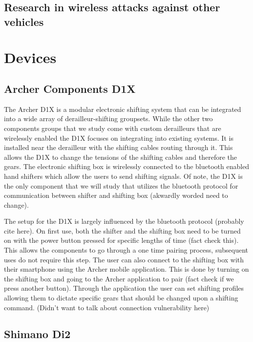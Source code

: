 \documentclass[letterpaper,twocolumn,10pt]{article}
\begin{document}
\subsection{Research in wireless attacks against other vehicles}



\section{Devices}
\subsection{Archer Components D1X}

The Archer D1X is a modular electronic shifting system that can be integrated into a wide array of derailleur-shifting groupsets. While the other two components groups that we study come with custom derailleurs that are wirelessly enabled the D1X focuses on integrating into existing systems. It is installed near the derailleur with the shifting cables routing through it. This allows the D1X to change the tensions of the shifting cables and therefore the gears. The electronic shifting box is wirelessly connected to the bluetooth enabled hand shifters which allow the users to send shifting signals. Of note, the D1X is the only component that we will study that utilizes the bluetooth protocol for communication between shifter and shifting box (akwardly worded need to change).

The setup for the D1X is largely influenced by the bluetooth protocol (probably cite here). On first use, both the shifter and the shifting box need to be turned on with the power button pressed for specific lengths of time (fact check this). This allows the components to go through a one time pairing process, subsequent uses do not require this step. The user can also connect to the shifting box with their smartphone using the Archer mobile application. This is done by turning on the shifting box and going to the Archer application to pair (fact check if we press another button). Through the application the user can set shifting profiles allowing them to dictate specific gears that should be changed upon a shifting command. (Didn't want to talk about connection vulnerability here)

\subsection{Shimano Di2}
\end{document}
